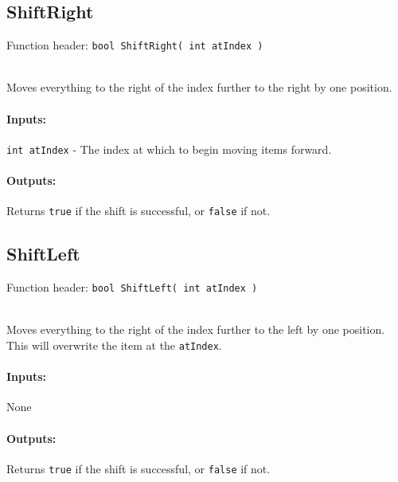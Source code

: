     \begin{framed}
    \subsection{ShiftRight}

    Function header: \texttt{bool ShiftRight( int atIndex )}

    ~\\ Moves everything to the right of the index further to the right by one position.

    \paragraph{Inputs:}
        \texttt{int atIndex} - The index at which to begin moving items forward.

    \paragraph{Outputs:}
        Returns \texttt{true} if the shift is successful, or \texttt{false} if not.

    \end{framed}
    
    \begin{framed}
    \subsection{ShiftLeft}

    Function header: \texttt{bool ShiftLeft( int atIndex )}

    ~\\ Moves everything to the right of the index further to the left by one position.
    This will overwrite the item at the \texttt{atIndex}.

    \paragraph{Inputs:}
        None

    \paragraph{Outputs:}
        Returns \texttt{true} if the shift is successful, or \texttt{false} if not.

    \end{framed}

